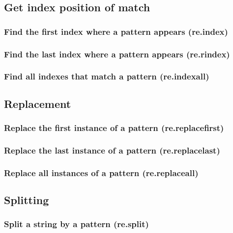 \documentclass{article}
\theoremstyle{definition}
\begin{document}
\subsection{Get index position of match}

\subsubsection{Find the first index where a pattern appears (re.index)}

\subsubsection{Find the last index where a pattern appears (re.rindex)}

\subsubsection{Find all indexes that match a pattern (re.indexall)}

\subsection{Replacement}

\subsubsection{Replace the first instance of a pattern (re.replacefirst)}

\subsubsection{Replace the last instance of a pattern (re.replacelast)}

\subsubsection{Replace all instances of a pattern (re.replaceall)}

\subsection{Splitting}

\subsubsection{Split a string by a pattern (re.split)}
\end{document}
